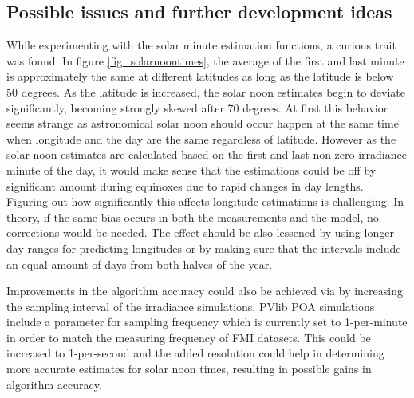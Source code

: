 \subsection{Possible issues and further development ideas}
While experimenting with the solar minute estimation functions, a curious trait was found. In figure \ref{fig_solarnoontimes}, the average of the first and last minute is approximately the same at different latitudes as long as the latitude is below 50 degrees. As the latitude is increased, the solar noon estimates begin to deviate significantly, becoming strongly skewed after 70 degrees. At first this behavior seems strange as astronomical solar noon should occur happen at the same time when longitude and the day are the same regardless of latitude. However as the solar noon estimates are calculated based on the first and last non-zero irradiance minute of the day, it would make sense that the estimations could be off by significant amount during equinoxes due to rapid changes in day lengths. Figuring out how significantly this affects longitude estimations is challenging. In theory, if the same bias occurs in both the measurements and the model, no corrections would be needed. The effect should be also lessened by using longer day ranges for predicting longitudes or by making sure that the intervals include an equal amount of days from both halves of the year. 

Improvements in the algorithm accuracy could also be achieved via by increasing the sampling interval of the irradiance simulations. PVlib POA simulations include a parameter for sampling frequency which is currently set to 1-per-minute in order to match the measuring frequency of FMI datasets. This could be increased to 1-per-second and the added resolution could help in determining more accurate estimates for solar noon times, resulting in possible gains in algorithm accuracy. 




